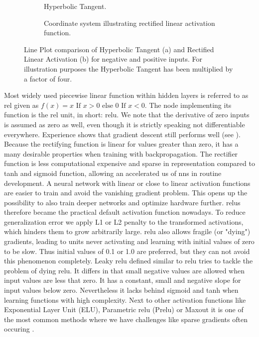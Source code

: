 \begin{figure}[hbt]
\centering
\begin{subfigure}[b]{0.4\textwidth}
    
    \caption[Hyperbolic tangent]{Hyperbolic Tangent.\\\hspace{0.4\textwidth}}
    \label{fig:tanh}
\end{subfigure}
\begin{subfigure}[b]{0.5\textwidth}
    
    \caption[Rectified linear activation function]{Coordinate system illustrating rectified linear activation function.}
    \label{fig:relu}
\end{subfigure}
\caption[Comparison tanh and ReLU]{Line Plot comparison of Hyperbolic Tangent (a) and Rectified Linear Activation (b) for negative and positive inputs. For illustration purposes the  Hyperbolic Tangent has been multiplied by a factor of four.}
\end{figure}
Most widely used piecewise linear function within hidden layers is referred to as \acrfull{rel} given as \( f(x)=x \text { If } x>0 \text { else } 0 \text { If } x<0 \). The node implementing its function is the \acrshort{rel} unit, in short: \acrshort{relu}. We note that the derivative of zero inputs is assumed as zero as well, even though it is strictly speaking not differentiable everywhere. Experience shows that gradient descent still performs well (see \cite{Goodfellow.2016}). Because the rectifying function is linear for values greater than zero, it has a many desirable properties when training with backpropagation. The rectifier function is less computational expensive and sparse in representation compared to tanh and sigmoid function, allowing an accelerated us of \acrshort{nn}s in routine development. A neural network with linear or close to linear activation functions are easier to train and avoid the vanishing gradient problem. This opens up the possibility to also train deeper networks and optimize hardware further. \Acrshort{relu}s therefore became the practical default activation function nowadays. To reduce generalization error we apply L1 or L2 penalty to the transformed activations, which hinders them to grow arbitrarily large. \cite{Glorot.2011} \Acrshort{relu} also allows fragile (or "dying") gradients, leading to units never activating and learning with initial values of zero to be slow. Thus initial values of 0.1 or 1.0 are preferred, but they can not avoid this phenomenon completely. \cite{Maas.2013} Leaky \acrshort{relu} defined similar to \acrshort{relu} tries to tackle the problem of dying \acrshort{relu}. It differs in that small negative values are allowed when input values are less that zero. It has a constant, small and negative slope for input values below zero. Nevertheless it lacks behind sigmoid and tanh when learning functions with high complexity. Next to other activation functions like Exponential Layer Unit (ELU), Parametric \acrshort{relu} (P\acrshort{relu}) or Maxout it is one of the most common methods where we have challenges like sparse gradients often occuring . 
